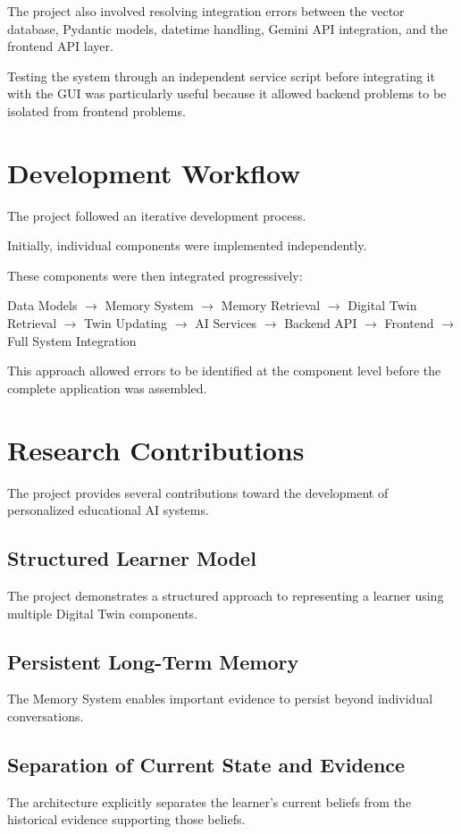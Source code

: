 \documentclass[12pt,a4paper]{article}
\begin{document}
The project also involved resolving integration errors between the vector database, Pydantic models, datetime handling, Gemini API integration, and the frontend API layer.

Testing the system through an independent service script before integrating it with the GUI was particularly useful because it allowed backend problems to be isolated from frontend problems.

\section{Development Workflow}
The project followed an iterative development process.

Initially, individual components were implemented independently.

These components were then integrated progressively:
\begin{center}
Data Models $\rightarrow$ Memory System $\rightarrow$ Memory Retrieval $\rightarrow$ Digital Twin Retrieval $\rightarrow$ Twin Updating $\rightarrow$ AI Services $\rightarrow$ Backend API $\rightarrow$ Frontend $\rightarrow$ Full System Integration
\end{center}

This approach allowed errors to be identified at the component level before the complete application was assembled.

\section{Research Contributions}
The project provides several contributions toward the development of personalized educational AI systems.

\subsection{Structured Learner Model}
The project demonstrates a structured approach to representing a learner using multiple Digital Twin components.

\subsection{Persistent Long-Term Memory}
The Memory System enables important evidence to persist beyond individual conversations.

\subsection{Separation of Current State and Evidence}
The architecture explicitly separates the learner's current beliefs from the historical evidence supporting those beliefs.
\end{document}

